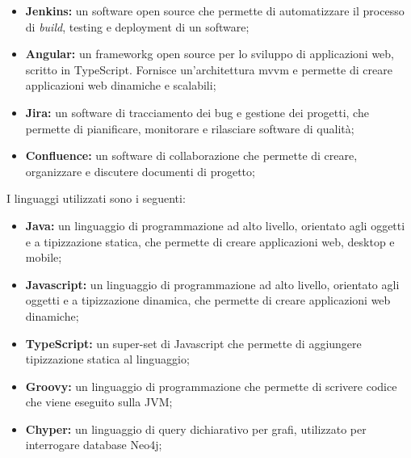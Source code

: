 \begin{itemize}
  \item \textbf{Jenkins:}  un software open source che permette di automatizzare il processo di \textit{build}, testing e deployment di un software;
  \item \textbf{Angular:} un {\gls{frameworkg}} open source per lo sviluppo di applicazioni web, scritto in TypeScript. 
  Fornisce un'architettura \gls{mvvm} e permette di creare applicazioni web dinamiche e scalabili;
  \item \textbf{Jira:} un software di tracciamento dei bug e gestione dei progetti, che permette di pianificare, monitorare e rilasciare software di qualità;
  \item \textbf{Confluence:} un software di collaborazione che permette di creare, organizzare e discutere documenti di progetto;
\end{itemize}

I linguaggi utilizzati sono i seguenti:\\

\begin{itemize}
  \item \textbf{Java:} un linguaggio di programmazione ad alto livello, orientato agli oggetti e a tipizzazione statica, che permette di creare applicazioni web, desktop e mobile;
  \item \textbf{Javascript:} un linguaggio di programmazione ad alto livello, orientato agli oggetti e a tipizzazione dinamica, che permette di creare applicazioni web dinamiche;
  \item \textbf{TypeScript:} un super-set di Javascript che permette di aggiungere tipizzazione statica al linguaggio;
  \item \textbf{Groovy:} un linguaggio di programmazione che permette di scrivere codice che viene eseguito sulla \gls{JVM};
  \item \textbf{Chyper:} un linguaggio di query dichiarativo per grafi, utilizzato per interrogare database \gls{Neo4j};
\end{itemize}

